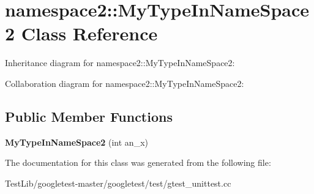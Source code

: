 \hypertarget{classnamespace2_1_1MyTypeInNameSpace2}{}\section{namespace2\+:\+:My\+Type\+In\+Name\+Space2 Class Reference}
\label{classnamespace2_1_1MyTypeInNameSpace2}


Inheritance diagram for namespace2\+:\+:My\+Type\+In\+Name\+Space2\+:


Collaboration diagram for namespace2\+:\+:My\+Type\+In\+Name\+Space2\+:
\subsection*{Public Member Functions}
\begin{DoxyCompactItemize}
\item 
\mbox{\label{classnamespace2_1_1MyTypeInNameSpace2_a033025628289dbf29022b2bfbe66f53e}} 
{\bfseries My\+Type\+In\+Name\+Space2} (int an\+\_\+x)
\end{DoxyCompactItemize}


The documentation for this class was generated from the following file\+:\begin{DoxyCompactItemize}
\item 
Test\+Lib/googletest-\/master/googletest/test/gtest\+\_\+unittest.\+cc\end{DoxyCompactItemize}
